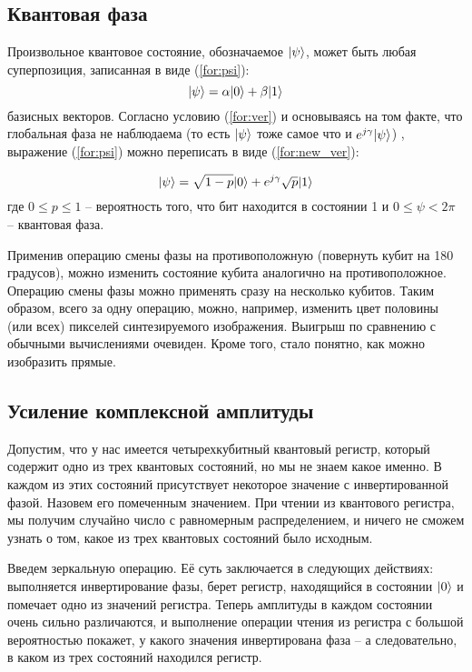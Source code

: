 \subsection{Квантовая фаза}

Произвольное квантовое состояние, обозначаемое $\lvert\psi\rangle$, может быть любая суперпозиция, записанная в виде (\ref{for:psi}):
\begin{equation}
\label{for:psi}
\lvert\psi\rangle = \alpha\lvert0\rangle + \beta\lvert1\rangle
\end{equation}
 базисных векторов. Согласно условию (\ref{for:ver}) и основываясь на том факте, что глобальная фаза не наблюдаема (то есть $\lvert\psi\rangle$ тоже самое что и $e^{j\gamma}\lvert\psi\rangle$) \cite{global-phase}, выражение (\ref{for:psi}) можно переписать в виде (\ref{for:new_ver}):
 
\begin{equation} 
\label{for:new_ver}
\lvert\psi\rangle = \sqrt{1 - p}\lvert0\rangle + e^{j\gamma}\sqrt{p}\lvert1\rangle
\end{equation} где $0 \leq p \leq 1$ -- вероятность того, что бит находится в состоянии 1 и $0 \leq \psi < 2\pi$ -- квантовая фаза.

Применив операцию смены фазы на противоположную (повернуть кубит на 180 градусов), можно изменить состояние кубита аналогично на противоположное. Операцию смены фазы можно применять сразу на несколько кубитов. Таким образом, всего за одну операцию, можно, например, изменить цвет половины (или всех) пикселей синтезируемого изображения. Выигрыш по сравнению с обычными вычислениями очевиден. Кроме того, стало понятно, как можно изобразить прямые. 

\subsection{Усиление комплексной амплитуды}

Допустим, что у нас имеется четырехкубитный квантовый регистр, который содержит одно из трех квантовых состояний, но мы не знаем какое именно. В каждом из этих состояний присутствует некоторое значение с инвертированной фазой. Назовем его помеченным значением. При чтении из квантового регистра, мы получим случайно число с равномерным распределением, и ничего не сможем узнать о том, какое из трех квантовых состояний было исходным.

Введем зеркальную операцию. Её суть заключается в следующих действиях: выполняется инвертирование фазы, берет регистр, находящийся в состоянии $\lvert0\rangle$ и помечает одно из значений регистра. Теперь амплитуды в каждом состоянии очень сильно различаются, и выполнение операции чтения из регистра с большой вероятностью покажет, у какого значения инвертирована фаза -- а следовательно, в каком из трех состояний находился регистр.

